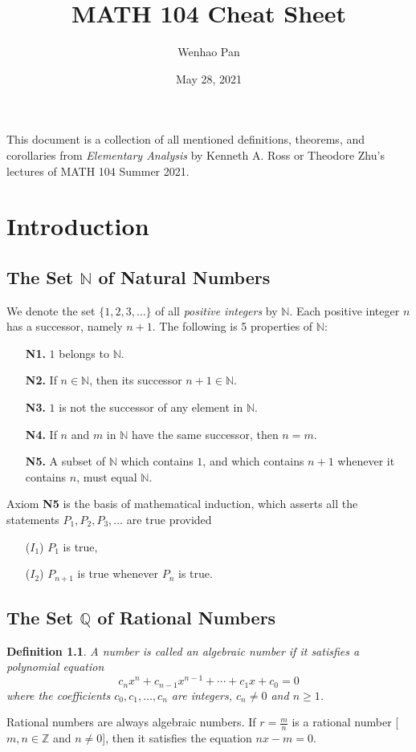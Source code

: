 \documentclass[12pt, lettersize]{book}
\title{MATH 104 Cheat Sheet}
\author{Wenhao Pan}
\date{May 28, 2021}
\newtheorem{dfn}[thm]{Definition}
\newcommand{\N}{\mathbb{N}}
\newcommand{\Q}{\mathbb{Q}}
\newcommand{\Z}{\mathbb{Z}}
\begin{document}
	\maketitle
	
	This document is a collection of all mentioned definitions, theorems, and corollaries from \emph{Elementary Analysis} by Kenneth A. Ross or Theodore Zhu's lectures of MATH 104 Summer 2021.
	
	\tableofcontents
	
	\chapter{Introduction}
	\newpage
	\section{The Set $\N$ of Natural Numbers}
		We denote the set $\{1,2,3,\dots\}$ of all \emph{positive integers} by $\N$. Each positive integer $n$ has a successor, namely $n+1$. The following is 5 properties of $\N$:
		\begin{itemize}
			\item[\textbf{N1.}] $1$ belongs to $\N$.
			\item[\textbf{N2.}] If $n\in\N$, then its successor $n+1\in\N$.
			\item[\textbf{N3.}] $1$ is not the successor of any element in $\N$.
			\item[\textbf{N4.}] If $n$ and $m$ in $\N$ have the same successor, then $n=m$.
			\item[\textbf{N5.}] A subset of $\N$ which contains $1$, and which contains $n+1$ whenever it contains $n$, must equal $\N$.
		\end{itemize}
		Axiom \textbf{N5} is the basis of mathematical induction, which asserts all the statements $P_1,P_2,P_3,\dots$ are true provided
		\begin{itemize}
			\item[(\textbf{$I_1$})] $P_1$ is true,
			\item[(\textbf{$I_2$})] $P_{n+1}$ is true whenever $P_n$ is true.
		\end{itemize}
		\newpage
	\section{The Set $\Q$ of Rational Numbers}
		\begin{dfn}
		A number is called an \emph{algebraic number} if it satisfies a polynomial equation
		\begin{displaymath}
			c_nx^n+c_{n-1}x^{n-1}+\cdots+c_1x+c_0=0
		\end{displaymath}
		where the coefficients $c_0,c_1,\dots,c_n$ are integers, $c_n\neq0$ and $n\geq1$.
		\end{dfn}
		Rational numbers are always algebraic numbers. If $r=\frac{m}{n}$ is a rational number [$m,n\in\Z$ and $n\neq0$], then it satisfies the equation $nx-m=0$.
		
\end{document}
